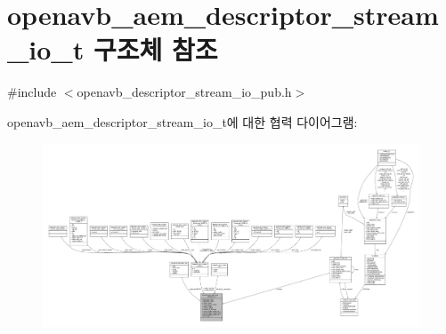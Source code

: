 \hypertarget{structopenavb__aem__descriptor__stream__io__t}{}\section{openavb\+\_\+aem\+\_\+descriptor\+\_\+stream\+\_\+io\+\_\+t 구조체 참조}
\label{structopenavb__aem__descriptor__stream__io__t}


{\ttfamily \#include $<$openavb\+\_\+descriptor\+\_\+stream\+\_\+io\+\_\+pub.\+h$>$}



openavb\+\_\+aem\+\_\+descriptor\+\_\+stream\+\_\+io\+\_\+t에 대한 협력 다이어그램\+:
\nopagebreak
\begin{figure}[H]
\begin{center}
\leavevmode
\includegraphics[width=350pt]{structopenavb__aem__descriptor__stream__io__t__coll__graph}
\end{center}
\end{figure}
